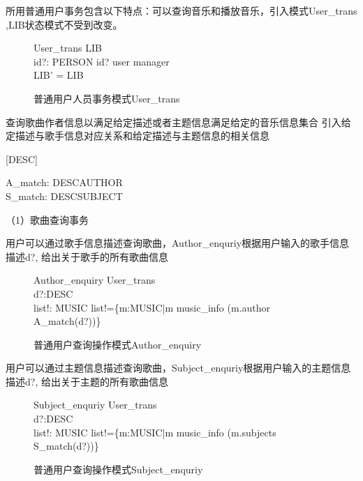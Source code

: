 \documentclass[14pt]{article}
\numberwithin{figure}{subsection}
\begin{document}
所用普通用户事务包含以下特点：可以查询音乐和播放音乐，引入模式User\_trans
,LIB状态模式不受到改变。

\begin{figure}[H]
    \setlength{\abovecaptionskip}{0.cm}
    \setlength{\belowcaptionskip}{0.cm}
    \begin{schema}{User\_trans}
        \Delta LIB\\
        id?: PERSON
        \where
        id? \in user \cup manager\\
        \theta LIB' = \theta LIB
    \end{schema}
    \caption{普通用户人员事务模式User\_trans}
\end{figure}

查询歌曲作者信息以满足给定描述或者主题信息满足给定的音乐信息集合
引入给定描述与歌手信息对应关系和给定描述与主题信息的相关信息

[DESC]
\vspace*{-0.2cm}
\begin{axdef}
    A\_match: DESC\leftrightarrow AUTHOR\\
    S\_match: DESC\leftrightarrow SUBJECT
\end{axdef}

（1）歌曲查询事务

用户可以通过歌手信息描述查询歌曲，Author\_enquriy根据用户输入的歌手信息描述d?,
给出关于歌手的所有歌曲信息
\vspace{-0.5cm}
\begin{figure}[H]
    \setlength{\abovecaptionskip}{0.cm}
    \setlength{\belowcaptionskip}{0.cm}
    \begin{schema}{Author\_enquiry}
        User\_trans\\
        d?:DESC\\
        list!: \power MUSIC
        \where
        list!=\{m:MUSIC|m \in \ran music\_info \wedge (m.author \cap A\_match(d?)\neq \emptyset)\}
    \end{schema}
    \caption{普通用户查询操作模式Author\_enquiry}
\end{figure}

\clearpage
用户可以通过主题信息描述查询歌曲，Subject\_enquriy根据用户输入的主题信息描述d?,
给出关于主题的所有歌曲信息

\vspace{-0.5cm}
\begin{figure}[H]
    \setlength{\abovecaptionskip}{0.cm}
    \setlength{\belowcaptionskip}{0.cm}
    \begin{schema}{Subject\_enquriy}
        User\_trans\\
        d?:DESC\\
        list!: \power MUSIC
        \where
        list!=\{m:MUSIC|m \in \ran music\_info \wedge (m.subjects \cap S\_match(d?)\neq \emptyset)\}
    \end{schema}
    \caption{普通用户查询操作模式Subject\_enquriy}
\end{figure}
\end{document}
